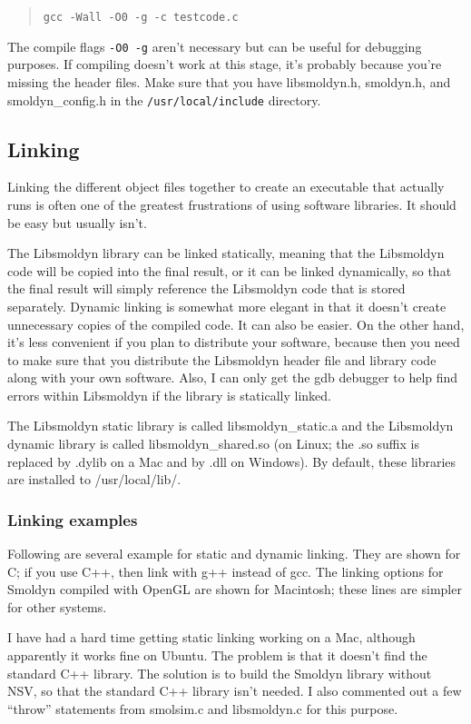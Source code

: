 \documentclass {scrbook}
\newcommand {\ttt} {\texttt}
\begin{document}
\begin{quote}
\lstinline{gcc -Wall -O0 -g -c testcode.c}
\end{quote}

The compile flags \ttt{-O0 -g} aren't necessary but can be useful for debugging purposes. If compiling doesn't work at this stage, it's probably because you're missing the header files. Make sure that you have libsmoldyn.h, smoldyn.h, and smoldyn\_config.h in the \ttt{/usr/local/include} directory.

\subsection*{Linking}

Linking the different object files together to create an executable that actually runs is often one of the greatest frustrations of using software libraries. It should be easy but usually isn't.

The Libsmoldyn library can be linked statically, meaning that the Libsmoldyn code will be copied into the final result, or it can be linked dynamically, so that the final result will simply reference the Libsmoldyn code that is stored separately. Dynamic linking is somewhat more elegant in that it doesn't create unnecessary copies of the compiled code. It can also be easier. On the other hand, it's less convenient if you plan to distribute your software, because then you need to make sure that you distribute the Libsmoldyn header file and library code along with your own software. Also, I can only get the gdb debugger to help find errors within Libsmoldyn if the library is statically linked.

The Libsmoldyn static library is called libsmoldyn\_static.a and the Libsmoldyn dynamic library is called libsmoldyn\_shared.so (on Linux; the .so suffix is replaced by .dylib on a Mac and by .dll on Windows). By default, these libraries are installed to /usr/local/lib/.

\subsubsection*{Linking examples}

Following are several example for static and dynamic linking. They are shown for C; if you use C++, then link with g++ instead of gcc. The linking options for Smoldyn compiled with OpenGL are shown for Macintosh; these lines are simpler for other systems.

I have had a hard time getting static linking working on a Mac, although apparently it works fine on Ubuntu. The problem is that it doesn't find the standard C++ library. The solution is to build the Smoldyn library without NSV, so that the standard C++ library isn't needed. I also commented out a few ``throw'' statements from smolsim.c and libsmoldyn.c for this purpose.
\end{document}
